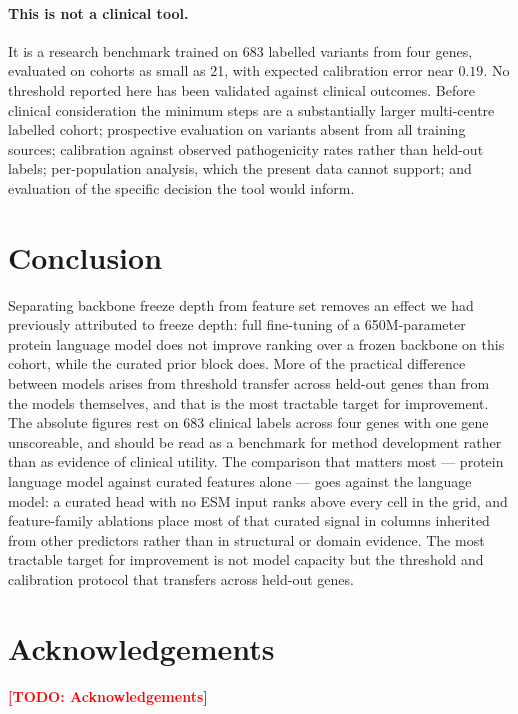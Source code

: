 \documentclass{bioinfo}
\newcommand{\todo}[1]{\textcolor{red}{\textbf{[TODO: #1]}}}
\begin{document}
\paragraph{This is not a clinical tool.}
It is a research benchmark trained on 683 labelled variants from four genes,
evaluated on cohorts as small as 21, with expected calibration error near
$0.19$. No threshold reported here has been validated against clinical outcomes.
Before clinical consideration the minimum steps are a substantially larger
multi-centre labelled cohort; prospective evaluation on variants absent from all
training sources; calibration against observed pathogenicity rates rather than
held-out labels; per-population analysis, which the present data cannot support;
and evaluation of the specific decision the tool would inform.

\section{Conclusion}

Separating backbone freeze depth from feature set removes an effect we had
previously attributed to freeze depth: full fine-tuning of a 650M-parameter
protein language model does not improve ranking over a frozen backbone on this
cohort, while the curated prior block does. More of the practical difference
between models arises from threshold transfer across held-out genes than from
the models themselves, and that is the most tractable target for improvement.
The absolute figures rest on 683 clinical labels across four genes with one gene
unscoreable, and should be read as a benchmark for method development rather
than as evidence of clinical utility. The comparison that matters most ---
protein language model against curated features alone --- goes against the
language model: a curated head with no ESM input ranks above every cell in the
grid, and feature-family ablations place most of that curated signal in columns
inherited from other predictors rather than in structural or domain evidence.
The most tractable target for improvement is not model capacity but the
threshold and calibration protocol that transfers across held-out genes.

\section*{Acknowledgements}
\todo{Acknowledgements}
\end{document}
